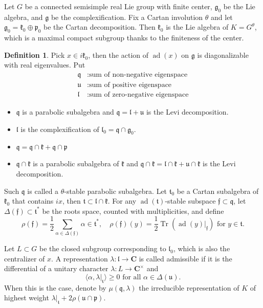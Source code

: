 \documentclass[leqno]{amsart}
\DeclareMathOperator{\adj}{ad}
\newcommand{\C}{\mathbf C}
\DeclareMathOperator{\Tr}{Tr}
\newcommand{\1}{\mathbf{1}}
\newcommand{\rfg}{\mathfrak{g}_0}
\newcommand{\cfg}{\mathfrak{g}}
\newcommand{\rfk}{\mathfrak{k}_0}
\newcommand{\cfk}{\mathfrak{k}}
\newcommand{\rfp}{\mathfrak{p}_0}
\newcommand{\cfp}{\mathfrak{p}}
\newcommand{\cfq}{\mathfrak{q}}
\newcommand{\cfu}{\mathfrak{u}}
\newcommand{\rfl}{\mathfrak{l}_0}
\newcommand{\cfl}{\mathfrak{l}}
\newcommand{\rft}{\mathfrak{t}_0}
\newcommand{\cft}{\mathfrak{t}}
\newcommand{\cff}{\mathfrak{f}}
\newcommand{\rt}{\Delta}
\theoremstyle{definition}
\newtheorem{defn}[thm]{Definition}
\theoremstyle{remark}
\begin{document}
Let $G$ be a connected semisimple real Lie group
with finite center,
$\rfg$ be the Lie algebra,
and $\cfg$ be the complexification.
Fix a Cartan involution $\theta$
and let  $\rfg=\rfk\oplus\rfp$
be the Cartan decomposition.
Then $\rfk$ is the Lie algebra of 
$K=G^\theta$, which is a maximal compact subgroup
thanks to the finiteness of the center.
\begin{defn}
	Pick $x\in i\rfk$,
	then the action of $\adj(x)$ on $\cfg$
	is diagonalizable with real eigenvalues. Put
	\begin{align*}
		\cfq&\colon \text{sum of non-negative eigenspace}\\
		\cfu&\colon \text{sum of positive eigenspace}\\
		\cfl&\colon \text{sum of zero-negative eigenspace}
	\end{align*}
        \begin{itemize}
		\item $\cfq$ is a parabolic subalgebra and
		$\cfq=\cfl+\cfu$
		is the Levi decomposition.
		\item $\cfl$ is the complexification 
		of $\rfl=\cfq\cap \rfg$.
		\item $\cfq=\cfq\cap\cfk+\cfq\cap\cfp$
		\item $\cfq\cap \cfk$ 
		is a parabolic subalgebra of $\cfk$ and
		$\cfq\cap\cfk=\cfl\cap\cfk+\cfu\cap\cfk$
		is the Levi decomposition.
       \end{itemize}
       Such $\cfq$ is called a  $\theta$-stable
       parabolic subalgebra.
       Let $\rft$ be a Cartan subalgebra 
       of $\rfk$ that contains $ix$,
       then $\cft\subset \cfl\cap\cfk$.
       For any $\adj(\cft)$-stable subspace $\cff\subset\cfq$,
       let $\rt(\cff)\subset \cft^*$
       be the roots space, counted with multiplicities,
       and define 
       \[
		\rho(\cff)=\frac{1}{2}\sum_{\alpha\in \Delta(\cff)}
		\alpha\in \cft^*,\quad
		\rho(\cff)(y)=\frac{1}{2}\Tr(\adj(y)\vert_{\cff})
		\text{ for }y\in \cft.
       \]

	Let $L\subset G$ be the closed subgroup
	corresponding to $\rfl$,
	which is also the centralizer of  $x$.
	A representation $\lambda\colon \cfl\to \C$ 
	is called admissible if 
	it is the differential of a unitary character
	$\lambda\colon L\to \C^\times$ and
	\[
	\langle \alpha, \lambda\vert_{\cft}\rangle\geq 0	
	\text{ for all }\alpha\in\rt(\cfu).
	\]
	When this is the case, denote by
	$\mu(\cfq,\lambda)$ the irreducible representation
	of $K$ of highest weight  
	$\lambda\vert_{\cft}+2\rho(\cfu\cap \cfp)$.
\end{defn}
\end{document}

